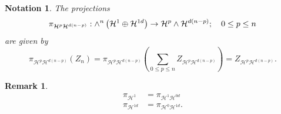 \documentclass[aps,preprint]{revtex4}%
\newtheorem{notation}[theorem]{Notation}
\newtheorem{remark}[theorem]{Remark}
\begin{document}
\begin{notation}
The projections
\begin{equation}
\pi_{\mathcal{H}^{p}\mathcal{H}^{d\left(  n-p\right)  }}:{\huge \wedge}%
^{n}\left(  \mathcal{H}^{1}\oplus\mathcal{H}^{1d}\right)  \rightarrow
\mathcal{H}^{p}\wedge\mathcal{H}^{d\left(  n-p\right)  };\quad0\leq p\leq n
\end{equation}
are given by
\begin{equation}
\pi_{\mathcal{H}^{p}\mathcal{H}^{d\left(  n-p\right)  }}\left(  Z_{n}\right)
=\pi_{\mathcal{H}^{p}\mathcal{H}^{d\left(  n-p\right)  }}\left(  \sum_{0\leq
p\leq n}Z_{\mathcal{H}^{p}\mathcal{H}^{d\left(  n-p\right)  }}\right)
=Z_{\mathcal{H}^{p}\mathcal{H}^{d\left(  n-p\right)  }}.
\end{equation}

\end{notation}

\begin{remark}%
\begin{align}
\pi_{\mathcal{H}^{1}}  &  =\pi_{\mathcal{H}^{1}\mathcal{H}^{0d}}\\
\pi_{\mathcal{H}^{1d}}  &  =\pi_{\mathcal{H}^{0}\mathcal{H}^{1d}}.
\end{align}

\end{remark}
\end{document}
